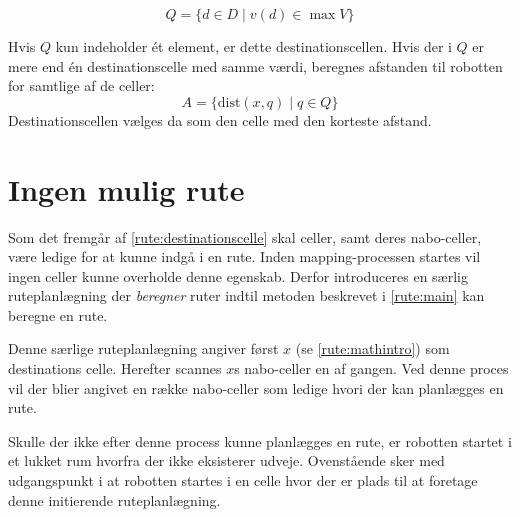 \begin{equation}
Q = \{ d \in D \mid v(d) \in \max V \}
\end{equation}

Hvis $ Q $ kun indeholder ét element, er dette destinationscellen. 
Hvis der i $Q$ er mere end én destinationscelle med samme værdi, beregnes afstanden til robotten for samtlige af de celler:
\begin{equation}
A = \{ \text{dist}(x,q) \mid q \in Q \}
\end{equation}
Destinationscellen vælges da som den celle med den korteste afstand.

\section{Ingen mulig rute}
Som det fremgår af \cref{rute:destinationscelle} skal celler, samt deres nabo-celler, være ledige for at kunne indgå i en rute.
Inden mapping-processen startes vil ingen celler kunne overholde denne egenskab.
Derfor introduceres en særlig ruteplanlægning der \textit{beregner} ruter indtil metoden beskrevet i \cref{rute:main} kan beregne en rute.

Denne særlige ruteplanlægning angiver først $x$ (se \cref{rute:mathintro}) som destinations celle.
Herefter scannes $x$s nabo-celler en af gangen.
Ved denne proces vil der blier angivet en række nabo-celler som ledige hvori der kan planlægges en rute.

Skulle der ikke efter denne process kunne planlægges en rute, er robotten startet i et lukket rum hvorfra der ikke eksisterer udveje.
Ovenstående sker med udgangspunkt i at robotten startes i en celle hvor der er plads til at foretage denne initierende ruteplanlægning.